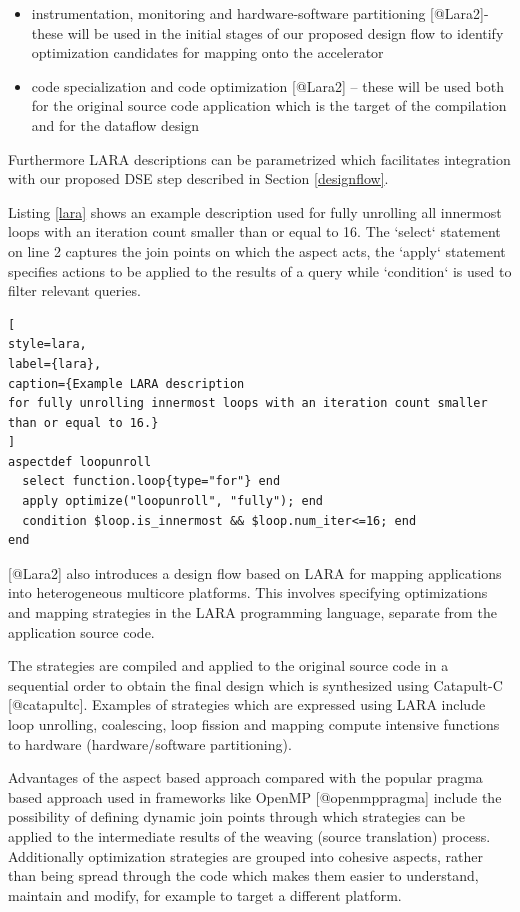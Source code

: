 \begin{itemize}
\item instrumentation, monitoring and hardware-software partitioning
  [@Lara2]- these will be used in the initial stages of our proposed
  design flow to identify optimization candidates for mapping onto
  the accelerator

\item code specialization and code optimization [@Lara2] -- these will be
  used both for the original source code application which is the
  target of the compilation and for the dataflow design
\end{itemize}

Furthermore LARA descriptions can be parametrized which facilitates
integration with our proposed DSE step described in Section
\ref{designflow}.

Listing \ref{lara} shows an example description used for fully
unrolling all innermost loops with an iteration count smaller than or
equal to 16. The `select` statement on line 2 captures the join points
on which the aspect acts, the `apply` statement specifies actions to
be applied to the results of a query while `condition` is used to
filter relevant queries.

\begin{lstlisting}[
style=lara,
label={lara},
caption={Example LARA description
for fully unrolling innermost loops with an iteration count smaller
than or equal to 16.}
]
aspectdef loopunroll
  select function.loop{type="for"} end
  apply optimize("loopunroll", "fully"); end
  condition $loop.is_innermost && $loop.num_iter<=16; end
end
\end{lstlisting}

[@Lara2] also introduces a design flow based on LARA for mapping
applications into heterogeneous multicore platforms. This involves
specifying optimizations and mapping strategies in the LARA
programming language, separate from the application source code.

The strategies are compiled and applied to the original source code in
a sequential order to obtain the final design which is synthesized
using Catapult-C [@catapultc]. Examples of strategies which are
expressed using LARA include loop unrolling, coalescing, loop fission
and mapping compute intensive functions to hardware (hardware/software
partitioning).

Advantages of the aspect based approach compared with the popular
pragma based approach used in frameworks like OpenMP [@openmppragma]
include the possibility of defining dynamic join points through which
strategies can be applied to the intermediate results of the weaving
(source translation) process. Additionally optimization strategies are
grouped into cohesive aspects, rather than being spread through the
code which makes them easier to understand, maintain and modify, for
example to target a different platform.


